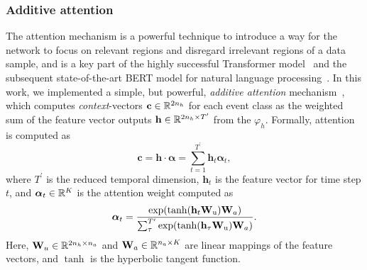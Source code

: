 \subsubsection{Additive attention}
The attention mechanism is a powerful technique to introduce a way for the network to focus on relevant regions and disregard irrelevant regions of a data sample, and is a key part of the highly successful Transformer model~\cite{Vaswani2017} and the subsequent state-of-the-art BERT model for natural language processing~\cite{Devlin2019}.
In this work, we implemented a simple, but powerful, \textit{additive attention} mechanism~\cite{Bahdanau2015}, which computes \textit{context}-vectors \(\mathbf{c} \in \mathbb{R}^{2n_h}\) for each event class as the weighted sum of the feature vector outputs \(\mathbf{h}\in\mathbb{R}^{2n_h \times T^{\prime}}\) from the \(\varphi_h\).
Formally, attention is computed as
\begin{equation}
    \mathbf{c} = \mathbf{h}\cdot\boldsymbol{\alpha} = \sum_{t=1}^{T^{\prime}} \mathbf{h}_t \boldsymbol{\alpha}_t,
\end{equation}
where \(T^{\prime}\) is the reduced temporal dimension, \(\mathbf{h}_t\) is the feature vector for time step \(t\), and \(\boldsymbol{\alpha}_t \in \mathbb{R}^{K}\) is the attention weight computed as
\begin{equation}
    \boldsymbol{\alpha}_t = \frac{ \func{\exp}{\func{\tanh}{\mathbf{h}_t\mathbf{W}_\text{u}}\mathbf{W}_{a}}}{\sum_{\tau}^{T^{\prime}}\func{\exp}{\func{\tanh}{\mathbf{h}_\tau\mathbf{W}_\text{u}}\mathbf{W}_{a}}}.
\end{equation}
Here, \(\mathbf{W}_u \in \mathbb{R}^{2n_h \times n_a}\) and \(\mathbf{W}_a \in \mathbb{R}^{n_a \times K}\) are linear mappings of the feature vectors, and \(\tanh\) is the hyperbolic tangent function.

